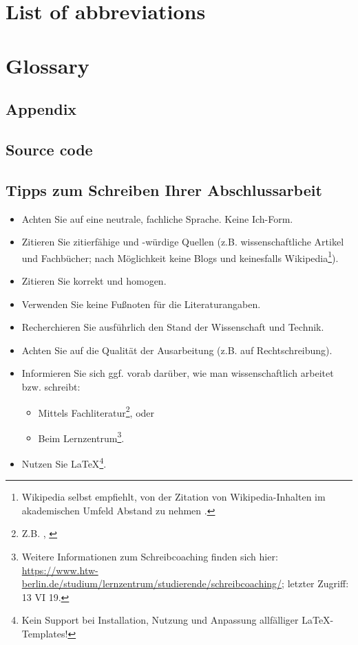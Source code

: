 \documentclass[oneside,bibliography=totocnumbered,BCOR=5mm]{scrbook}%
\theoremstyle{definition}
\theoremstyle{definition}
\theoremstyle{definition}
\theoremstyle{definition}
\theoremstyle{definition}
\theoremstyle{definition}
\begin{document}
\printbibliography[
heading=bibintoc,
title={List of sources}
]


\newpage

\chapter{List of abbreviations}
\newpage
\chapter{Glossary}




\begin{appendix}


\chapter{Appendix}


\section{Source code}

\section{Tipps zum Schreiben Ihrer Abschlussarbeit}

\begin{itemize}
\item Achten Sie auf eine neutrale, fachliche Sprache. Keine \glqq{}Ich\grqq{}-Form.
\item Zitieren Sie zitierf\"ahige und -w\"urdige Quellen (z.B. wissenschaftliche Artikel und Fachb\"ucher; nach M\"oglichkeit keine Blogs und keinesfalls Wikipedia\footnote{Wikipedia selbst empfiehlt, von der Zitation von Wikipedia-Inhalten im akademischen Umfeld Abstand zu nehmen \autocite{wikipedia2019}.}). 
\item Zitieren Sie korrekt und homogen.
\item Verwenden Sie keine Fu{\ss}noten f\"ur die Literaturangaben.
\item Recherchieren Sie ausf\"uhrlich den Stand der Wissenschaft und Technik.
\item Achten Sie auf die Qualit\"at der Ausarbeitung (z.B. auf Rechtschreibung).
\item Informieren Sie sich ggf. vorab dar\"uber, wie man wissenschaftlich arbeitet bzw. schreibt:
\begin{itemize}
\item Mittels Fachliteratur\footnote{Z.B. \autocite{balzert2011}, \autocite{franck2013}}, oder
\item Beim Lernzentrum\footnote{Weitere Informationen zum Schreibcoaching finden sich hier: \url{https://www.htw-berlin.de/studium/lernzentrum/studierende/schreibcoaching/}; letzter Zugriff: 13 VI 19.}.
\end{itemize}
\item Nutzen Sie \LaTeX\footnote{Kein Support bei Installation, Nutzung und Anpassung allf\"alliger \LaTeX-Templates!}.
\end{itemize}




\end{appendix}
\end{document}
